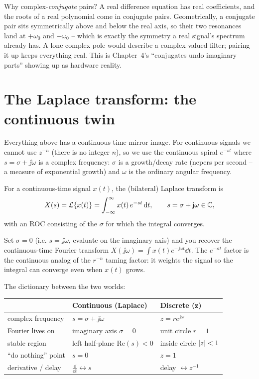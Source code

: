 \begin{whybox}
Why complex-\emph{conjugate} pairs? A real difference equation has real coefficients, and
the roots of a real polynomial come in conjugate pairs. Geometrically, a conjugate pair
sits symmetrically above and below the real axis, so their two resonances land at
$+\omega_0$ and $-\omega_0$ -- which is exactly the symmetry a real signal's spectrum
already has. A lone complex pole would describe a complex-valued filter; pairing it up
keeps everything real. This is Chapter~4's ``conjugates undo imaginary
parts'' showing up as hardware reality.
\end{whybox}

\section{The Laplace transform: the continuous twin}
\label{ch15:laplace}

Everything above has a continuous-time mirror image. For continuous signals we cannot use
$z^{-n}$ (there is no integer $n$), so we use the continuous spiral $e^{-st}$ where
$s = \sigma + \jj\omega$ is a complex frequency: $\sigma$ is a growth/decay rate (nepers per second -- a measure of exponential growth) and $\omega$ is the ordinary angular frequency.

\begin{definition}
\label{ch15:def-laplace}
For a continuous-time signal $x(t)$, the (bilateral) Laplace transform is
\[
  X(s) = \mathcal{L}\{x(t)\} = \int_{-\infty}^{\infty} x(t)\, e^{-st}\,\mathrm{d} t, \qquad s=\sigma+\mathrm{j}\omega \in \mathbb{C},
\]
with an ROC consisting of the $\sigma$ for which the integral converges.
\end{definition}

Set $\sigma=0$ (i.e. $s=\jj\omega$, evaluate on the imaginary axis) and you recover the
continuous-time Fourier transform $X(\jj\omega)=\int x(t)e^{-\jj\omega t}\dd t$. The
$e^{-\sigma t}$ factor is the continuous analog of the $r^{-n}$ taming factor: it weights
the signal so the integral can converge even when $x(t)$ grows.

\begin{focusbox}
The dictionary between the two worlds:
\begin{center}
\begin{tabular}{lll}
\toprule
 & \textbf{Continuous (Laplace)} & \textbf{Discrete (z)} \\
\midrule
complex frequency & $s=\sigma+\jj\omega$ & $z=re^{\jj\omega}$ \\
Fourier lives on & imaginary axis $\sigma=0$ & unit circle $r=1$ \\
stable region & left half-plane $\mathrm{Re}(s)<0$ & inside circle $\lvert z\rvert<1$ \\
``do nothing'' point & $s=0$ & $z=1$ \\
derivative / delay & $\tfrac{\dd}{\dd t}\leftrightarrow s$ & delay $\leftrightarrow z^{-1}$ \\
\bottomrule
\end{tabular}
\end{center}
\end{focusbox}

